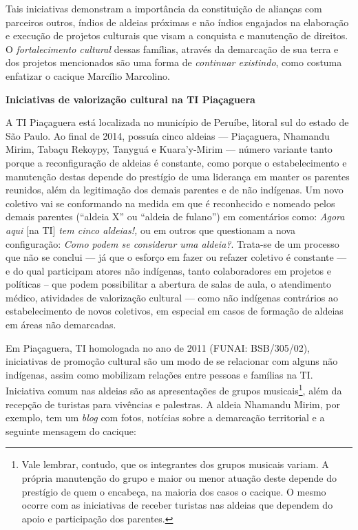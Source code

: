 Tais iniciativas demonstram a importância da constituição de alianças
com parceiros outros, índios de aldeias próximas e não índios engajados
na elaboração e execução de projetos culturais que visam a conquista e
manutenção de direitos. O \emph{fortalecimento cultural} dessas
famílias, através da demarcação de sua terra e dos projetos mencionados
são uma forma de \emph{continuar existindo}, como costuma enfatizar o
cacique Marcílio Marcolino.

\textbf{Iniciativas de valorização cultural na TI Piaçaguera}

A TI Piaçaguera está localizada no município de Peruíbe, litoral sul do
estado de São Paulo. Ao final de 2014, possuía cinco aldeias ---
Piaçaguera, Nhamandu Mirim, Tabaçu Rekoypy, Tanyguá e Kuara'y-Mirim ---
número variante tanto porque a reconfiguração de aldeias é constante,
como porque o estabelecimento e manutenção destas depende do prestígio
de uma liderança em manter os parentes reunidos, além da legitimação dos
demais parentes e de não indígenas. Um novo coletivo vai se conformando
na medida em que é reconhecido e nomeado pelos demais parentes (``aldeia
X'' ou ``aldeia de fulano'') em comentários como: \emph{Agora aqui}
{[}na TI{]} \emph{tem cinco aldeias!,} ou em outros que questionam a
nova configuração: \emph{Como podem se considerar uma aldeia?}. Trata-se
de um processo que não se conclui --- já que o esforço em fazer ou
refazer coletivo é constante --- e do qual participam atores não
indígenas, tanto colaboradores em projetos e políticas -- que podem
possibilitar a abertura de salas de aula, o atendimento médico,
atividades de valorização cultural --- como não indígenas contrários ao
estabelecimento de novos coletivos, em especial em casos de formação de
aldeias em áreas não demarcadas.

Em Piaçaguera, TI homologada no ano de 2011 (FUNAI: BSB/305/02),
iniciativas de promoção cultural são um modo de se relacionar com alguns
não indígenas, assim como mobilizam relações entre pessoas e famílias na
TI. Iniciativa comum nas aldeias são as apresentações de grupos
musicais\footnote{Vale lembrar, contudo, que os integrantes dos grupos
  musicais variam. A própria manutenção do grupo e maior ou menor
  atuação deste depende do prestígio de quem o encabeça, na maioria dos
  casos o cacique. O mesmo ocorre com as iniciativas de receber turistas
  nas aldeias que dependem do apoio e participação dos parentes.}, além
da recepção de turistas para vivências e palestras. A aldeia Nhamandu
Mirim, por exemplo, tem um \emph{blog} com fotos, notícias sobre a
demarcação territorial e a seguinte mensagem do cacique:

